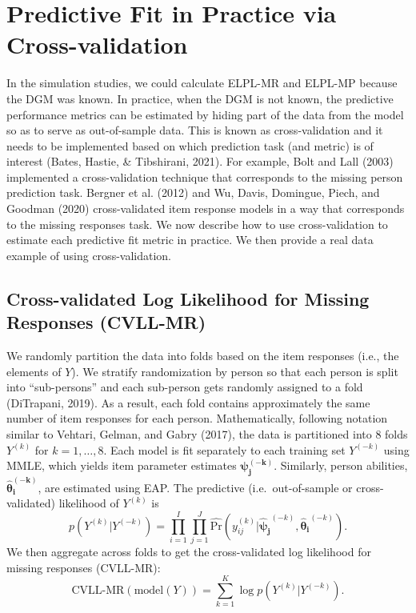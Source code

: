 \documentclass[
  english,
  man,floatsintext]{apa7}
\begin{document}
\hypertarget{real}{%
\section{Predictive Fit in Practice via Cross-validation}\label{real}}

In the simulation studies, we could calculate ELPL-MR and ELPL-MP because the DGM was known. In practice, when the DGM is not known, the predictive performance metrics can be estimated by hiding part of the data from the model so as to serve as out-of-sample data. This is known as cross-validation and it needs to be implemented based on which prediction task (and metric) is of interest (Bates, Hastie, \& Tibshirani, 2021). For example, Bolt and Lall (2003) implemented a cross-validation technique that corresponds to the missing person prediction task. Bergner et al. (2012) and Wu, Davis, Domingue, Piech, and Goodman (2020) cross-validated item response models in a way that corresponds to the missing responses task. We now describe how to use cross-validation to estimate each predictive fit metric in practice. We then provide a real data example of using cross-validation.

\hypertarget{cross-validated-log-likelihood-for-missing-responses-cvll-mr}{%
\subsection{Cross-validated Log Likelihood for Missing Responses (CVLL-MR)}\label{cross-validated-log-likelihood-for-missing-responses-cvll-mr}}

We randomly partition the data into folds based on the item responses (i.e., the elements of \(Y\)). We stratify randomization by person so that each person is split into ``sub-persons'' and each sub-person gets randomly assigned to a fold (DiTrapani, 2019). As a result, each fold contains approximately the same number of item responses for each person. Mathematically, following notation similar to Vehtari, Gelman, and Gabry (2017), the data is partitioned into 8 folds \(Y^{(k)}\) for \(k = 1, \dots, 8\). Each model is fit separately to each training set \(Y^{(-k)}\) using MMLE, which yields item parameter estimates \(\bm{\psi_j^{(-k)}}\). Similarly, person abilities, \(\bm{\hat\theta_i^{(-k)}}\), are estimated using EAP. The predictive (i.e.~out-of-sample or cross-validated) likelihood of \(Y^{(k)}\) is
\begin{equation}
p(Y^{(k)} | Y^{(-k)}) = \prod_{i=1}^{I} \prod_{j=1}^{J}  \hat{\text{Pr}}(y_{ij}^{(k)} | \bm{\hat\psi_j}^{(-k)}, \bm{\hat\theta_i}^{(-k)}).
\end{equation}
We then aggregate across folds to get the cross-validated log likelihood for missing responses (CVLL-MR):
\begin{equation}
\text{CVLL-MR}(\text{model}(Y)) = \sum_{k = 1}^{K} \log p(Y^{(k)} | Y^{(-k)}).
\end{equation}
\end{document}
